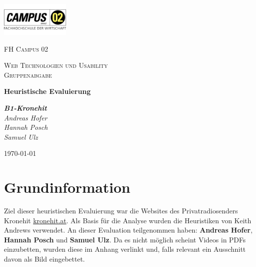 \documentclass{article}
\begin{document}
	\begin{titlepage}
		\centering
		\includegraphics[width=0.25\textwidth]{Bilder/02logo.png}\par\vspace{1cm}
		{\scshape\LARGE FH Campus 02 \par}
		\vspace{1cm}
		{\scshape\Large Web Technologien und Usability \\ Gruppenabgabe\par}
		\vspace{1.5cm}
		{\huge\bfseries Heuristische Evaluierung\par}
		\vspace{2cm}
		{\Large\itshape {\LARGE \bfseries B1-Kronehit} \vspace{1cm} \\ Andreas Hofer \\ Hannah Posch \\ Samuel Ulz\par}
		\vfill
		{\large \today\par}
	\end{titlepage}
	\tableofcontents
	\newpage
	\section{Grundinformation}
	Ziel dieser heuristischen Evaluierung war die Websites des Privatradiosenders Kronehit \href{https://kronehit.at}{kronehit.at}. Als Basis für die Analyse wurden die Heuristiken von Keith Andrews verwendet. An dieser Evaluation teilgenommen haben: \textbf{Andreas Hofer}, \textbf{Hannah Posch} und \textbf{Samuel Ulz}. Da es nicht möglich scheint Videos in PDFs einzubetten, wurden diese im Anhang verlinkt und, falls relevant ein Ausschnitt davon als Bild eingebettet.
\end{document}
